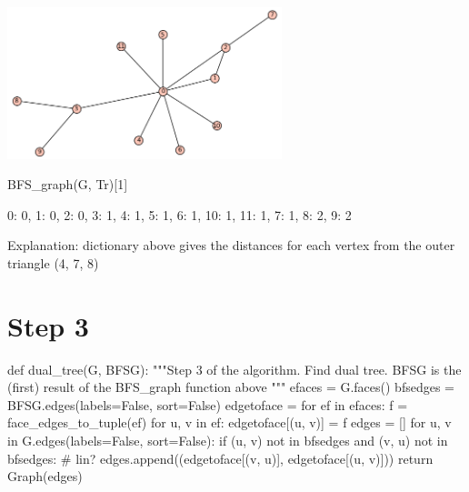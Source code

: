 \begin{outImage}
   \includegraphics[width=0.6\textwidth]{Images/BalancedSeparators/bfs_tree.png}
\end{outImage}

\begin{sageCell}
    BFS_graph(G, Tr)[1]
\end{sageCell}

\begin{outCell}
    {0: 0, 1: 0, 2: 0, 3: 1, 4: 1, 5: 1, 6: 1, 10: 1, 11: 1, 7: 1, 8: 2, 9: 2}
\end{outCell}
Explanation: dictionary above gives the distances for each vertex from the outer triangle (4, 7, 8)

\section*{Step 3}

\begin{sageCell}
def dual_tree(G, BFSG):
    """Step 3 of the algorithm. Find dual tree. BFSG is the (first) result of the BFS_graph function above
    """
    efaces = G.faces()
    bfsedges = BFSG.edges(labels=False, sort=False)
    edgetoface = {}
    for ef in efaces:
        f = face_edges_to_tuple(ef)
        for u, v in ef:
            edgetoface[(u, v)] = f
    edges = []
    for u, v in G.edges(labels=False, sort=False):
        if (u, v) not in bfsedges and (v, u) not in bfsedges: # lin?
            edges.append((edgetoface[(v, u)], edgetoface[(u, v)]))
    return Graph(edges)
\end{sageCell}


